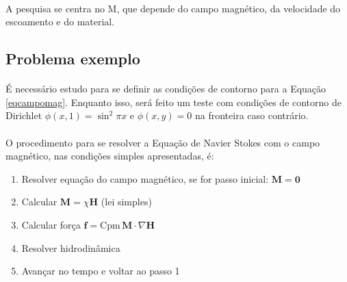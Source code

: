\documentclass[eletromagnetismo.tex]{subfiles}
\begin{document}
\paragraph{} A pesquisa se centra no $\mathrm{M}$, que depende do campo magnético, da velocidade do escoamento e do material.

\subsection{Problema exemplo}
\paragraph{} É necessário estudo para se definir as condições de contorno para a Equação \ref{eqcampomag}. Enquanto isso, será feito um teste com condições de contorno de Dirichlet $\phi(x,1) = \sin^2\pi x$ e $\phi(x,y)=0$ na fronteira caso contrário.

\paragraph{} O procedimento para se resolver a Equação de Navier Stokes com o campo magnético, nas condições simples apresentadas, é:

\begin{enumerate}
	\item Resolver equação do campo magnético, se for passo inicial: $\mathbf{M} = \mathbf{0}$
	\item Calcular $\mathbf{M} = \chi \mathbf{H}$ (lei simples)
	\item Calcular força $\mathbf{f} = \mathrm{Cpm}\,\mathbf{M}\cdot \nabla \mathbf{H}$
	\item Resolver hidrodinâmica
	\item Avançar no tempo e voltar ao passo 1
\end{enumerate}
\end{document}
